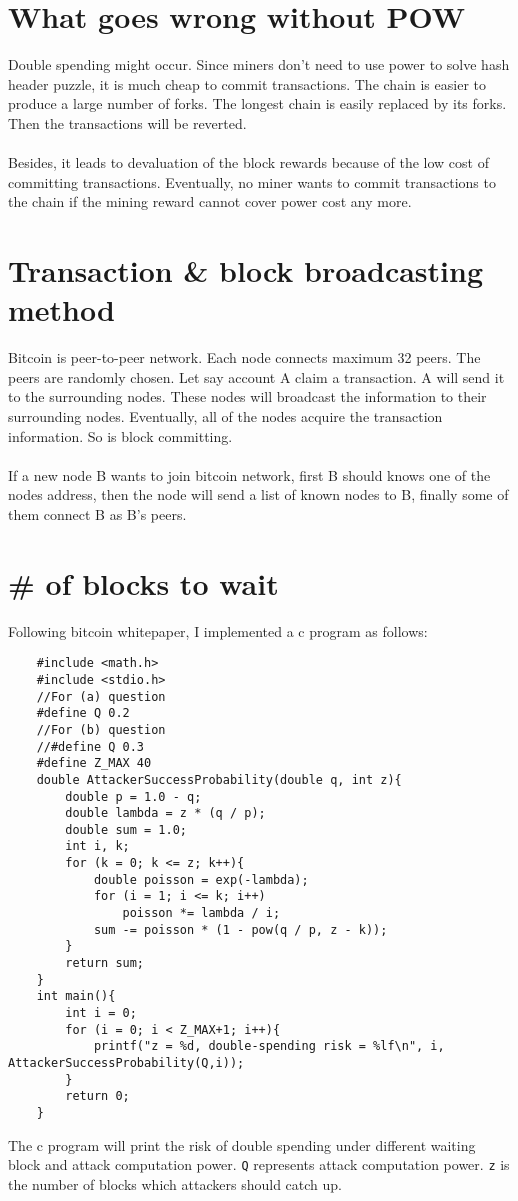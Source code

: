 \documentclass{article}
\begin{document}
\section{What goes wrong without POW}
Double spending might occur. Since miners don't need to use power to solve hash header puzzle, it is much cheap to commit transactions. The chain is easier to produce a large number of forks. The longest chain is easily replaced by its forks. Then the transactions will be reverted.\\\\
Besides, it leads to devaluation of the block rewards because of the low cost of committing transactions. Eventually, no miner wants to commit transactions to the chain if the mining reward cannot cover power cost any more.
\section{Transaction \& block broadcasting method}
Bitcoin is peer-to-peer network. Each node connects maximum 32 peers. The peers are randomly chosen. Let say account A claim a transaction. A will send it to the surrounding nodes. These nodes will broadcast the information to their surrounding nodes. Eventually, all of the nodes acquire the transaction information. So is block committing.\\\\
If a new node B wants to join bitcoin network, first B should knows one of the nodes address, then the node will send a list of known nodes to B, finally some of them connect B as B's peers.
\section{\# of blocks to wait}
Following bitcoin whitepaper, I implemented a c program as follows:
\begin{verbatim}
    #include <math.h>
    #include <stdio.h>
    //For (a) question
    #define Q 0.2
    //For (b) question
    //#define Q 0.3
    #define Z_MAX 40
    double AttackerSuccessProbability(double q, int z){
        double p = 1.0 - q;
        double lambda = z * (q / p);
        double sum = 1.0;
        int i, k;
        for (k = 0; k <= z; k++){
            double poisson = exp(-lambda);
            for (i = 1; i <= k; i++)
                poisson *= lambda / i;
            sum -= poisson * (1 - pow(q / p, z - k));
        }
        return sum; 
    }
    int main(){
        int i = 0;
        for (i = 0; i < Z_MAX+1; i++){
            printf("z = %d, double-spending risk = %lf\n", i, AttackerSuccessProbability(Q,i));
        }
        return 0;
    }
\end{verbatim}
The c program will print the risk of double spending under different waiting block and attack computation power. \verb|Q| represents attack computation power. \verb|z| is the number of blocks which attackers should catch up.
\end{document}
